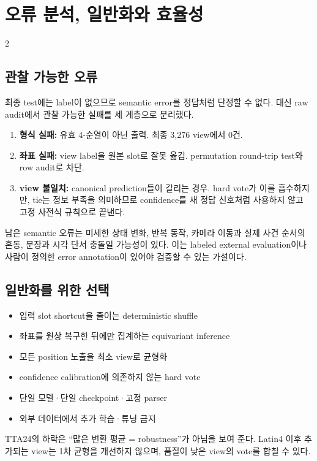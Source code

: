 \documentclass[9pt,a4paper]{extarticle}
\begin{document}
\section{오류 분석, 일반화와 효율성}
\begin{multicols}{2}

\subsection{관찰 가능한 오류}

최종 test에는 label이 없으므로 semantic error를 정답처럼 단정할 수 없다.
대신 raw audit에서 관찰 가능한 실패를 세 계층으로 분리했다.

\begin{enumerate}
\item \textbf{형식 실패:} 유효 4-순열이 아닌 출력. 최종 3,276 view에서 0건.
\item \textbf{좌표 실패:} view label을 원본 slot로 잘못 옮김. permutation
round-trip test와 row audit로 차단.
\item \textbf{view 불일치:} canonical prediction들이 갈리는 경우.
hard vote가 이를 흡수하지만, tie는 정보 부족을 의미하므로 confidence를 새
정답 신호처럼 사용하지 않고 고정 사전식 규칙으로 끝낸다.
\end{enumerate}

남은 semantic 오류는 미세한 상태 변화, 반복 동작, 카메라 이동과 실제 사건 순서의
혼동, 문장과 시각 단서 충돌일 가능성이 있다. 이는 labeled external evaluation이나
사람이 정의한 error annotation이 있어야 검증할 수 있는 가설이다.

\subsection{일반화를 위한 선택}

\begin{itemize}
\item 입력 slot shortcut을 줄이는 deterministic shuffle
\item 좌표를 원상 복구한 뒤에만 집계하는 equivariant inference
\item 모든 position 노출을 최소 view로 균형화
\item confidence calibration에 의존하지 않는 hard vote
\item 단일 모델·단일 checkpoint·고정 parser
\item 외부 데이터에서 추가 학습·튜닝 금지
\end{itemize}

TTA24의 하락은 ``많은 변환 평균 = robustness''가 아님을 보여 준다. Latin4 이후
추가되는 view는 1차 균형을 개선하지 않으며, 품질이 낮은 view의 vote를 합칠 수 있다.


\end{multicols}
\end{document}
